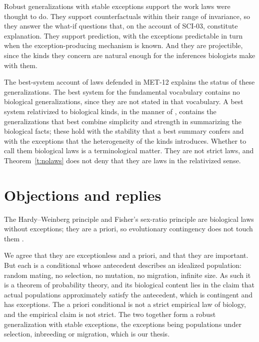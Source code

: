 \documentclass{situationist-preprint}
\begin{document}
Robust generalizations with stable exceptions support the work laws were thought to do. They support counterfactuals within their range of invariance, so they answer the what-if questions that, on the account of SCI-03, constitute explanation. They support prediction, with the exceptions predictable in turn when the exception-producing mechanism is known. And they are projectible, since the kinds they concern are natural enough for the inferences biologists make with them.

The best-system account of laws defended in MET-12 explains the status of these generalizations. The best system for the fundamental vocabulary contains no biological generalizations, since they are not stated in that vocabulary. A best system relativized to biological kinds, in the manner of \citet{CohenCallender2009}, contains the generalizations that best combine simplicity and strength in summarizing the biological facts; these hold with the stability that a best summary confers and with the exceptions that the heterogeneity of the kinds introduces. Whether to call them biological laws is a terminological matter. They are not strict laws, and Theorem~\ref{t:nolaws} does not deny that they are laws in the relativized sense.

\section{Objections and replies}\label{s:objections}

\begin{objection}\label{o:apriori}
The Hardy--Weinberg principle and Fisher's sex-ratio principle are biological laws without exceptions; they are a priori, so evolutionary contingency does not touch them \citep{Sober1997,Elgin2003}.
\end{objection}

\begin{reply}
We agree that they are exceptionless and a priori, and that they are important. But each is a conditional whose antecedent describes an idealized population: random mating, no selection, no mutation, no migration, infinite size. As such it is a theorem of probability theory, and its biological content lies in the claim that actual populations approximately satisfy the antecedent, which is contingent and has exceptions. The a priori conditional is not a strict empirical law of biology, and the empirical claim is not strict. The two together form a robust generalization with stable exceptions, the exceptions being populations under selection, inbreeding or migration, which is our thesis.
\end{reply}
\end{document}
